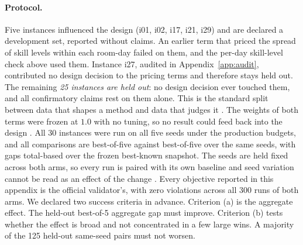 \documentclass[11pt]{article}
\begin{document}
	\paragraph{Protocol.} Five instances influenced the design (i01, i02, i17, i21, i29) and are declared a development set, reported without claims. An earlier term that priced the spread of skill levels within each room-day failed on them, and the per-day skill-level check above used them. Instance i27, audited in Appendix~\ref{app:audit}, contributed no
	design decision to the pricing terms and therefore stays held out. The remaining \emph{25 instances
	are held out}: no design decision ever touched them, and all confirmatory claims rest on them
	alone. This is the standard split between data that shapes a method and data that judges it
	\citep{hastie2009}. The weights of both terms were frozen at $1.0$ with no tuning, so no result could feed back into the design \citep{nosek2018}. All 30
	instances were run on all five seeds under the production budgets, and all comparisons are
	best-of-five against best-of-five over the same seeds, with gaps total-based over the frozen
	best-known snapshot. The seeds are held fixed across both arms, so every run is paired with its own
	baseline and seed variation cannot be read as an effect of the change
	\citep{barr1995}. Every objective reported in this appendix is the official validator's, with
	zero violations across all 300 runs of both arms. We declared two success criteria in advance. Criterion (a) is the aggregate effect. The held-out best-of-5 aggregate gap must improve. Criterion (b) tests whether the effect is broad and not concentrated in a few large wins. A majority of the 125 held-out same-seed pairs must not worsen.
\end{document}
